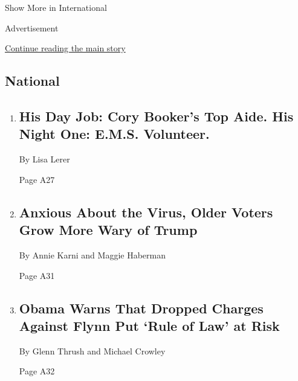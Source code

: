Show More in International

Advertisement

\protect\hyperlink{after-mid2}{Continue reading the main story}

\hypertarget{national}{%
\subsection{National}\label{national}}

\begin{enumerate}
\def\labelenumi{\arabic{enumi}.}
\item
  \href{/2020/05/07/us/politics/coronavirus-new-jersey.html}{}

  \hypertarget{his-day-job-cory-bookers-top-aide-his-night-one-ems-volunteer-1}{%
  \subsection{His Day Job: Cory Booker's Top Aide. His Night One: E.M.S.
  Volunteer.}\label{his-day-job-cory-bookers-top-aide-his-night-one-ems-volunteer-1}}

  By Lisa Lerer

  Page A27
\item
  \href{/2020/05/09/us/politics/trump-older-voters-2020.html}{}

  \hypertarget{anxious-about-the-virus-older-voters-grow-more-wary-of-trump}{%
  \subsection{Anxious About the Virus, Older Voters Grow More Wary of
  Trump}\label{anxious-about-the-virus-older-voters-grow-more-wary-of-trump}}

  By Annie Karni and Maggie Haberman

  Page A31
\item
  \href{/2020/05/09/us/politics/obama-flynn-coronavirus-trump.html}{}

  \hypertarget{obama-warns-that-dropped-charges-against-flynn-put-rule-of-law-at-risk}{%
  \subsection{Obama Warns That Dropped Charges Against Flynn Put `Rule
  of Law' at
  Risk}\label{obama-warns-that-dropped-charges-against-flynn-put-rule-of-law-at-risk}}

  By Glenn Thrush and Michael Crowley

  Page A32
\end{enumerate}

